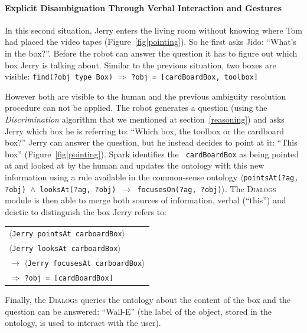 \documentclass[preprint,3p,times]{elsarticle}
\newcommand{\concept}[1]{{\small \texttt{#1}}}
\newcommand{\stmt}[1]{{\footnotesize\tt$\langle$#1\relax$\rangle$}}
\begin{document}
\paragraph{Explicit Disambiguation Through Verbal Interaction and Gestures}

In this second situation, Jerry enters the living room without knowing where Tom had
placed the video tapes (Figure~\ref{fig|pointing}). So he first asks Jido:
``What's in the box?''. Before the robot can answer the question it has to
figure out which box Jerry is talking about. Similar to the previous situation,
two boxes are visible: \concept{find(?obj type Box)} $\Rightarrow$ \concept{?obj = [cardBoardBox, toolbox]}

However both are visible to the human and the previous ambiguity resolution
procedure can not be applied. The robot generates a question (using the
\emph{Discrimination} algorithm that we mentioned at section~\ref{reasoning})
and asks Jerry which box he is referring to: ``Which box, the toolbox or the
cardboard box?'' Jerry can answer the question, but he instead decides to point
at it: ``This box'' (Figure~\ref{fig|pointing}). {\sc Spark} identifies the {\tt
cardBoardBox} as being pointed at and looked at by the human and updates the
ontology with this new information using a rule available in the common-sense
ontology \stmt{pointsAt(?ag, ?obj) $\land$ looksAt(?ag, ?obj) $\to$
focusesOn(?ag, ?obj)}. The \textsc{Dialogs} module is then able to merge both
sources of information, verbal (``this'') and deictic to distinguish the box
Jerry refers to:

\begin{center} 
    \begin{tabular}{l} 
        \stmt{Jerry pointsAt carboardBox}\\ 
        \stmt{Jerry looksAt carboardBox}\\ 
        $\to$ \stmt{Jerry focusesAt carboardBox}\\ 
        \hspace{0.7cm}$\Rightarrow$ {\tt ?obj = [cardBoardBox]}
    \end{tabular} 
\end{center}

Finally, the \textsc{Dialogs} queries the ontology about the content of the box
and the question can be answered: ``Wall-E'' (the label of the object, stored in the
ontology, is used to interact with the user).

\end{document}
